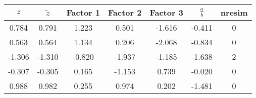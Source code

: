 \begin{tabular}{ccccccc}
\toprule
   $z$ &  $\tilde{z}$ &  Factor 1 &  Factor 2 &  Factor 3 &  $\frac{a}{b}$ &  nresim \\
\midrule
 0.784 &        0.791 &     1.223 &     0.501 &    -1.616 &         -0.411 &       0 \\
 0.563 &        0.564 &     1.134 &     0.206 &    -2.068 &         -0.834 &       0 \\
-1.306 &       -1.310 &    -0.820 &    -1.937 &    -1.185 &         -1.638 &       2 \\
-0.307 &       -0.305 &     0.165 &    -1.153 &     0.739 &         -0.020 &       0 \\
 0.988 &        0.982 &     0.255 &     0.974 &     0.202 &         -1.481 &       0 \\
\bottomrule
\end{tabular}
